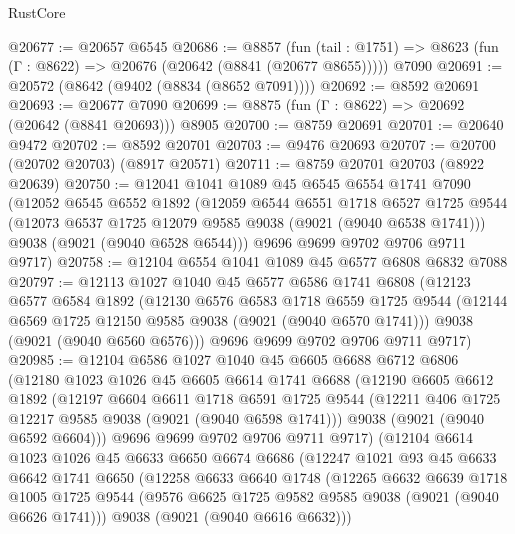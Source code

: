 \begin{lexlean}{RustCore}
\begin{coremodule}
@20677 := @20657 @6545
@20686 := @8857
    (fun (tail : @1751) => @8623 (fun (Γ : @8622) => @20676 (@20642 (@8841 (@20677 @8655)))))
    @7090
@20691 := @20572 (@8642 (@9402 (@8834 (@8652 @7091))))
@20692 := @8592 @20691
@20693 := @20677 @7090
@20699 := @8875 (fun (Γ : @8622) => @20692 (@20642 (@8841 @20693))) @8905
@20700 := @8759 @20691
@20701 := @20640 @9472
@20702 := @8592 @20701
@20703 := @9476 @20693
@20707 := @20700 (@20702 @20703) (@8917 @20571)
@20711 := @8759 @20701 @20703 (@8922 @20639)
@20750 := @12041
    @1041
    @1089
    @45
    @6545
    @6554
    @1741
    @7090
    (@12052
      @6545
      @6552
      @1892
      (@12059
        @6544
        @6551
        @1718
        @6527
        @1725
        @9544
        (@12073 @6537 @1725 @12079 @9585 @9038 (@9021 (@9040 @6538 @1741)))
        @9038
        (@9021 (@9040 @6528 @6544)))
      @9696
      @9699
      @9702
      @9706
      @9711
      @9717)
@20758 := @12104 @6554 @1041 @1089 @45 @6577 @6808 @6832 @7088
@20797 := @12113
    @1027
    @1040
    @45
    @6577
    @6586
    @1741
    @6808
    (@12123
      @6577
      @6584
      @1892
      (@12130
        @6576
        @6583
        @1718
        @6559
        @1725
        @9544
        (@12144 @6569 @1725 @12150 @9585 @9038 (@9021 (@9040 @6570 @1741)))
        @9038
        (@9021 (@9040 @6560 @6576)))
      @9696
      @9699
      @9702
      @9706
      @9711
      @9717)
@20985 := @12104
    @6586
    @1027
    @1040
    @45
    @6605
    @6688
    @6712
    @6806
    (@12180
      @1023
      @1026
      @45
      @6605
      @6614
      @1741
      @6688
      (@12190
        @6605
        @6612
        @1892
        (@12197
          @6604
          @6611
          @1718
          @6591
          @1725
          @9544
          (@12211 @406 @1725 @12217 @9585 @9038 (@9021 (@9040 @6598 @1741)))
          @9038
          (@9021 (@9040 @6592 @6604)))
        @9696
        @9699
        @9702
        @9706
        @9711
        @9717)
      (@12104
        @6614
        @1023
        @1026
        @45
        @6633
        @6650
        @6674
        @6686
        (@12247
          @1021
          @93
          @45
          @6633
          @6642
          @1741
          @6650
          (@12258
            @6633
            @6640
            @1748
            (@12265
              @6632
              @6639
              @1718
              @1005
              @1725
              @9544
              (@9576 @6625 @1725 @9582 @9585 @9038 (@9021 (@9040 @6626 @1741)))
              @9038
              (@9021 (@9040 @6616 @6632)))

\end{coremodule}
\end{lexlean}
